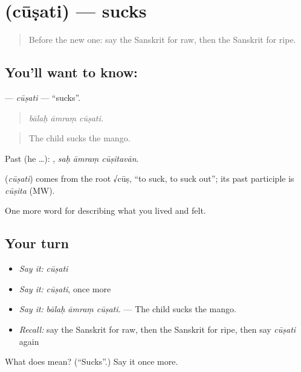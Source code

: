 \section[\texorpdfstring{\sk{चूषति} (cūṣati)}{चूषति (cūṣati)}]{ (cūṣati) — sucks}

\label{lesson:SA-C515-cusati}



\begin{quote}
Before the new one: say the Sanskrit for raw, then the Sanskrit for ripe.
\end{quote}

\subsection*{You'll want to know: }
\textbf{} — \emph{cūṣati} — \textquotedblleft{}sucks\textquotedblright{}.

\begin{quote}
  
\end{quote}

\begin{quote}
\emph{bālaḥ āmraṃ cūṣati.}
\end{quote}

\begin{quote}
The child sucks the mango.
\end{quote}

Past (he …):   , \emph{saḥ āmraṃ cūṣitavān}.

\begin{cousinweb}
\textbf{} (\emph{cūṣati}) comes from the root √cūṣ, \textquotedblleft{}to suck, to suck out\textquotedblright{}; its past participle is \emph{cūṣita} (MW).
\end{cousinweb}

\begin{grammarlens}[title={What you've built}]
One more word for describing what you lived and felt.
\end{grammarlens}

\subsection*{Your turn}
\begin{itemize}
\raggedright
  \item \emph{Say it:} \emph{cūṣati}
  \item \emph{Say it:} \emph{cūṣati}, once more
  \item \emph{Say it:} \emph{bālaḥ āmraṃ cūṣati.} — The child sucks the mango.
  \item \emph{Recall:} say the Sanskrit for raw, then the Sanskrit for ripe, then say \emph{cūṣati} again
\end{itemize}

\begin{tcolorbox}[breakable,colback=teal!4,colframe=teal!35!black,title={Before you move on}]
What does  mean? (\textquotedblleft{}Sucks\textquotedblright{}.) Say it once more.
\end{tcolorbox}
